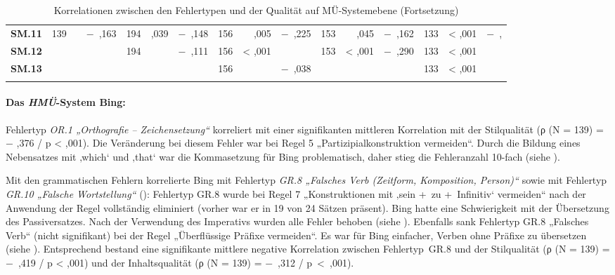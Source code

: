 \begin{sidewaystable}
\begin{tabularx}{\textwidth}{Qrrrrrrrrrrrrrrr}
\textbf{SM.11} & 139 &  & $-$~,163 & 194 & ,039 & $-$~,148 & 156 & ,005 & $-$~,225 & 153 & ,045 & $-$~,162 & 133 & < ,001 & $-$~,\\
\textbf{SM.12} &  &  &  & 194 &  & $-$~,111 & 156 & < ,001 &  & 153 & < ,001 & $-$~,290 & 133 & < ,001 & \\
\textbf{SM.13} &  &  &  &  &  &  & 156 &  & $-$~,038 &  &  &  & 133 & < ,001 & \\
\lspbottomrule
\end{tabularx}
\caption{\label{tab:05:98c}Korrelationen zwischen den Fehlertypen und der Qualität auf MÜ-Systemebene (Fortsetzung)   }
\end{sidewaystable}

\paragraph*{Das \textit{HMÜ}{}-System Bing:}
Fehlertyp \textit{OR.1 „Orthografie -- Zeichensetzung“} korreliert mit einer signifikanten mittleren Korrelation mit der Stilqualität (ρ (N = 139) = $-$ ,376 / p < ,001). Die Veränderung bei diesem Fehler war bei Regel 5 „Partizipialkonstruktion vermeiden“. Durch die Bildung eines Nebensatzes mit ‚which‘ und ‚that‘ war die Kommasetzung für Bing problematisch, daher stieg die Fehleranzahl 10-fach (siehe ).

Mit den grammatischen Fehlern korrelierte Bing mit Fehlertyp \textit{GR.8 „Falsches Verb (Zeitform, Komposition, Person)“} sowie mit Fehlertyp \textit{GR.10 „Falsche Wortstellung“} (): Fehlertyp GR.8 wurde bei Regel 7 „Konstruktionen mit ‚sein +~zu +~Infinitiv‘ vermeiden“ nach der Anwendung der Regel vollständig eliminiert (vorher war er in 19 von 24 Sätzen präsent). Bing hatte eine Schwierigkeit mit der Übersetzung des Passiversatzes. Nach der Verwendung des Imperativs wurden alle Fehler behoben (siehe ). Ebenfalls sank Fehlertyp GR.8 „Falsches Verb“ (nicht signifikant) bei der Regel „Überflüssige Präfixe vermeiden“. Es war für Bing einfacher, Verben ohne Präfixe zu übersetzen (siehe ). Entsprechend bestand eine signifikante mittlere negative Korrelation zwischen Fehlertyp~GR.8 und der Stilqualität (ρ (N = 139) = $-$~,419 / p < ,001) und der Inhaltsqualität (ρ (N = 139) = $-$~,312 / p~<~,001).

